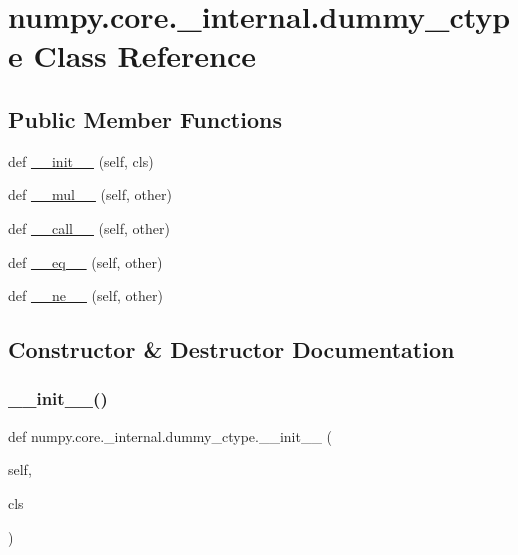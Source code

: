 \hypertarget{classnumpy_1_1core_1_1__internal_1_1dummy__ctype}{}\section{numpy.\+core.\+\_\+internal.\+dummy\+\_\+ctype Class Reference}
\label{classnumpy_1_1core_1_1__internal_1_1dummy__ctype}
\subsection*{Public Member Functions}
\begin{DoxyCompactItemize}
\item 
def \hyperlink{classnumpy_1_1core_1_1__internal_1_1dummy__ctype_ad361e5d138f2299b1b9d88aa89942c11}{\+\_\+\+\_\+init\+\_\+\+\_\+} (self, cls)
\item 
def \hyperlink{classnumpy_1_1core_1_1__internal_1_1dummy__ctype_a77a39bd5f269e2e18aef23332e221b1b}{\+\_\+\+\_\+mul\+\_\+\+\_\+} (self, other)
\item 
def \hyperlink{classnumpy_1_1core_1_1__internal_1_1dummy__ctype_a63cec5d333fa3485519343a748ee50ef}{\+\_\+\+\_\+call\+\_\+\+\_\+} (self, other)
\item 
def \hyperlink{classnumpy_1_1core_1_1__internal_1_1dummy__ctype_aef2013ec86ba3d0c3103a5f5fff7278e}{\+\_\+\+\_\+eq\+\_\+\+\_\+} (self, other)
\item 
def \hyperlink{classnumpy_1_1core_1_1__internal_1_1dummy__ctype_a74db7b62c925b1224678fa0eca90775a}{\+\_\+\+\_\+ne\+\_\+\+\_\+} (self, other)
\end{DoxyCompactItemize}


\subsection{Constructor \& Destructor Documentation}
\mbox{\label{classnumpy_1_1core_1_1__internal_1_1dummy__ctype_ad361e5d138f2299b1b9d88aa89942c11}} 
\subsubsection{\texorpdfstring{\+\_\+\+\_\+init\+\_\+\+\_\+()}{\_\_init\_\_()}}
{\footnotesize\ttfamily def numpy.\+core.\+\_\+internal.\+dummy\+\_\+ctype.\+\_\+\+\_\+init\+\_\+\+\_\+ (\begin{DoxyParamCaption}\item[{}]{self,  }\item[{}]{cls }\end{DoxyParamCaption})}



